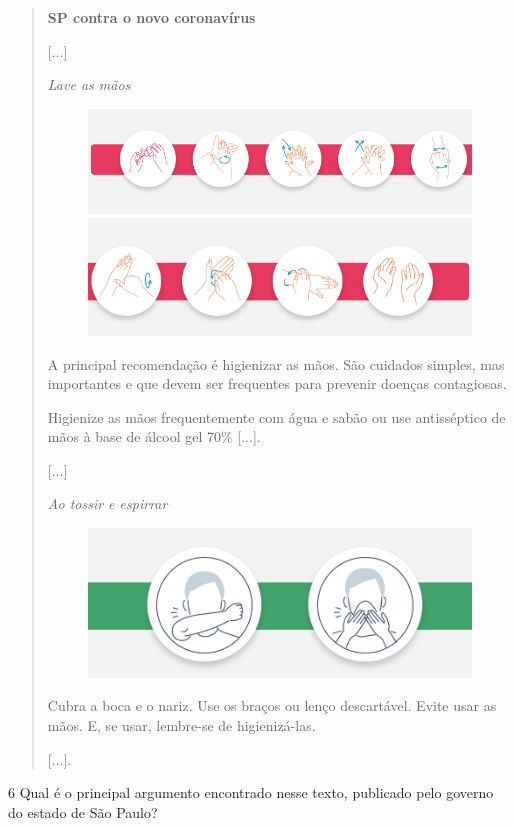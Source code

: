 \begin{quote}
\textbf{SP contra o novo coronavírus}

{[}...{]}

\textit{Lave as mãos}

\begin{figure}[htpb!]
\includegraphics[width=.5\textwidth]{./imgs/img12.png}
\includegraphics[width=.5\textwidth]{./imgs/img13.png}
\end{figure}

A principal recomendação é higienizar as mãos. São cuidados simples,
mas importantes e que devem ser frequentes para prevenir doenças
contagiosas.

Higienize as mãos frequentemente com água e sabão ou use antisséptico de
mãos à base de álcool gel 70\% {[}...{]}.

{[}...{]}

\textit{Ao tossir e espirrar}

\begin{figure}[htpb!]
\includegraphics[width=.5\textwidth]{./imgs/img14.png}
\end{figure}

Cubra a boca e o nariz. Use os braços ou lenço descartável. Evite usar
as mãos. E, se usar, lembre-se de higienizá-las.

{[}...{]}.

\end{quote}

\num{6} Qual é o principal argumento encontrado nesse texto, publicado pelo governo do estado de São Paulo?



